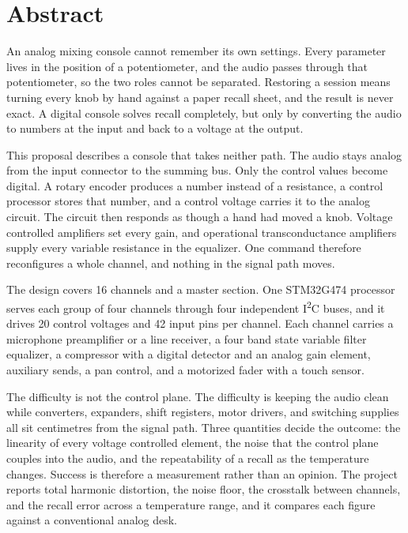 \documentclass[11pt, letterpaper,titlepage]{article}
\begin{document}
\justify

\tableofcontents

\section{Abstract}

An analog mixing console cannot remember its own settings. Every parameter lives
in the position of a potentiometer, and the audio passes through that
potentiometer, so the two roles cannot be separated. Restoring a session means
turning every knob by hand against a paper recall sheet, and the result is never
exact. A digital console solves recall completely, but only by converting the
audio to numbers at the input and back to a voltage at the output.

This proposal describes a console that takes neither path. The audio stays
analog from the input connector to the summing bus. Only the control values
become digital. A rotary encoder produces a number instead of a resistance, a
control processor stores that number, and a control voltage carries it to the
analog circuit. The circuit then responds as though a hand had moved a knob.
Voltage controlled amplifiers set every gain, and operational transconductance
amplifiers supply every variable resistance in the equalizer. One command
therefore reconfigures a whole channel, and nothing in the signal path moves.

The design covers 16 channels and a master section. One STM32G474 processor
serves each group of four channels through four independent
I\textsuperscript{2}C buses, and it drives 20 control voltages and 42 input pins
per channel. Each channel carries a microphone preamplifier or a line receiver,
a four band state variable filter equalizer, a compressor with a digital
detector and an analog gain element, auxiliary sends, a pan control, and a
motorized fader with a touch sensor.

The difficulty is not the control plane. The difficulty is keeping the audio
clean while converters, expanders, shift registers, motor drivers, and switching
supplies all sit centimetres from the signal path. Three quantities decide the
outcome: the linearity of every voltage controlled element, the noise that the
control plane couples into the audio, and the repeatability of a recall as the
temperature changes. Success is therefore a measurement rather than an opinion.
The project reports total harmonic distortion, the noise floor, the crosstalk
between channels, and the recall error across a temperature range, and it
compares each figure against a conventional analog desk.
\end{document}
